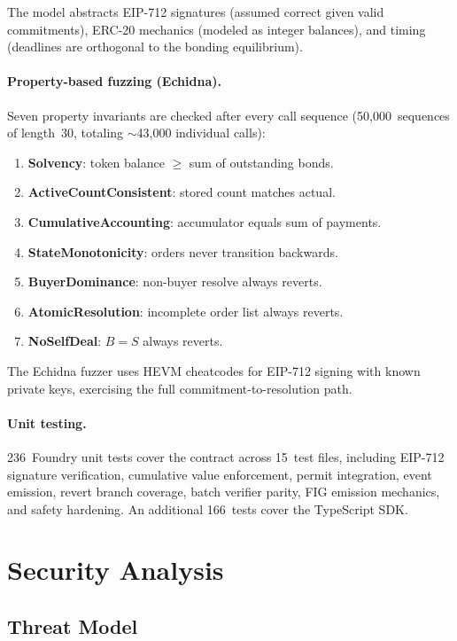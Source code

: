 \documentclass[11pt,a4paper]{article}
\theoremstyle{definition}
\theoremstyle{remark}
\begin{document}
The model abstracts EIP-712 signatures (assumed correct given valid
commitments), ERC-20 mechanics (modeled as integer balances), and
timing (deadlines are orthogonal to the bonding equilibrium).

\paragraph{Property-based fuzzing (Echidna).}
Seven property invariants are checked after every call sequence
(50{,}000~sequences of length~30, totaling $\sim$43{,}000 individual
calls):
\begin{enumerate}[label=\textbf{E\arabic*}]
  \item \textbf{Solvency}: token balance $\geq$ sum of outstanding bonds.
  \item \textbf{ActiveCountConsistent}: stored count matches actual.
  \item \textbf{CumulativeAccounting}: accumulator equals sum of payments.
  \item \textbf{StateMonotonicity}: orders never transition backwards.
  \item \textbf{BuyerDominance}: non-buyer resolve always reverts.
  \item \textbf{AtomicResolution}: incomplete order list always reverts.
  \item \textbf{NoSelfDeal}: $B = S$ always reverts.
\end{enumerate}
The Echidna fuzzer uses HEVM cheatcodes for EIP-712 signing with known
private keys, exercising the full commitment-to-resolution path.

\paragraph{Unit testing.}
236~Foundry unit tests cover the contract across 15~test files, including
EIP-712 signature verification, cumulative value enforcement, permit
integration, event emission, revert branch coverage, batch verifier
parity, FIG emission mechanics, and safety
hardening. An additional 166~tests cover the TypeScript SDK.

\section{Security Analysis}
\label{sec:security}

\subsection{Threat Model}
\end{document}
